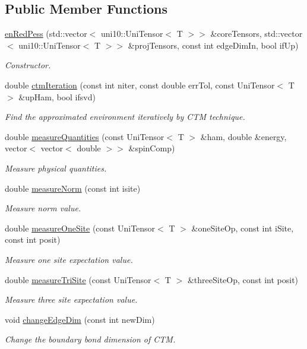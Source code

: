 \subsection*{Public Member Functions}
\begin{DoxyCompactItemize}
\item 
\hyperlink{classenRedPess_a91399d7a90a88e81f936095386c339ec}{en\+Red\+Pess} (std\+::vector$<$ uni10\+::\+Uni\+Tensor$<$ T $>$$>$ \&core\+Tensors, std\+::vector$<$ uni10\+::\+Uni\+Tensor$<$ T $>$$>$ \&proj\+Tensors, const int edge\+Dim\+In, bool if\+Up)
\begin{DoxyCompactList}\small\item\em Constructor. \end{DoxyCompactList}\item 
double \hyperlink{classenRedPess_ae9c6f4a82f9f96e71b9ba0996556a977}{ctm\+Iteration} (const int niter, const double err\+Tol, const Uni\+Tensor$<$ T $>$ \&up\+Ham, bool ifsvd)
\begin{DoxyCompactList}\small\item\em Find the approximated environment iteratively by C\+TM technique. \end{DoxyCompactList}\item 
double \hyperlink{classenRedPess_a44096759e82e808968dd89e44434e98d}{measure\+Quantities} (const Uni\+Tensor$<$ T $>$ \&ham, double \&energy, vector$<$ vector$<$ double $>$$>$ \&spin\+Comp)
\begin{DoxyCompactList}\small\item\em Measure physical quantities. \end{DoxyCompactList}\item 
double \hyperlink{classenRedPess_a5f2bd2c1e1a3c3d435edffd091da8546}{measure\+Norm} (const int isite)
\begin{DoxyCompactList}\small\item\em Measure norm value. \end{DoxyCompactList}\item 
double \hyperlink{classenRedPess_ace1d4b4eb833ca01442c1f6fc3b57ee7}{measure\+One\+Site} (const Uni\+Tensor$<$ T $>$ \&one\+Site\+Op, const int i\+Site, const int posit)
\begin{DoxyCompactList}\small\item\em Measure one site expectation value. \end{DoxyCompactList}\item 
double \hyperlink{classenRedPess_a3ac7c1e96cc7de682a50ff230548aa67}{measure\+Tri\+Site} (const Uni\+Tensor$<$ T $>$ \&three\+Site\+Op, const int posit)
\begin{DoxyCompactList}\small\item\em Measure three site expectation value. \end{DoxyCompactList}\item 
void \hyperlink{classenRedPess_aa693be8cff16bf5daa039d2b58a395bc}{change\+Edge\+Dim} (const int new\+Dim)
\begin{DoxyCompactList}\small\item\em Change the boundary bond dimension of C\+TM. \end{DoxyCompactList}\end{DoxyCompactItemize}
